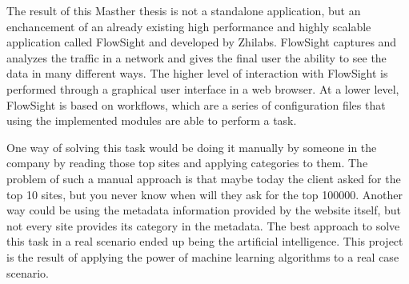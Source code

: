 The result of this Masther thesis is not a standalone application, but an enchancement of an already existing high performance and highly scalable application called FlowSight and developed by Zhilabs.
FlowSight captures and analyzes the traffic in a network and gives the final user the ability to see the data in many different ways. The higher level of interaction with FlowSight is performed through
a graphical user interface in a web browser. At a lower level, FlowSight is based on workflows, which are a series of configuration files that using the implemented modules are able to perform a task.


One way of solving this task would be doing it manually by someone in the company by reading those top sites and applying categories to them.
The problem of such a manual approach is that maybe today the client asked for the top 10 sites, but you never know when will they ask for the top 100000. 
Another way could be using the metadata information provided by the website itself, but not every site provides its category in the metadata.
The best approach to solve this task in a real scenario ended up being the artificial intelligence.
This project is the result of applying the power of machine learning algorithms to a real case scenario.

